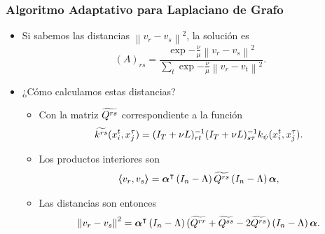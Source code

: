\documentclass[aspectratio=43]{beamer}
\newcommand{\norm}[1]{\left\lVert#1\right\rVert}
\newcommand{\upper}[1]{\expandafter\MakeUppercase\expandafter{#1}}
\newcommand{\mymat}[1]{\upper{#1}}
\newcommand{\myvec}[1]{\bm{#1}}
\newcommand{\fv}[1]{\myvec{#1}}
\newcommand{\fm}[1]{\mymat{#1}}
\newcommand{\dotp}[2]{\bm{\left\langle} #1, #2 \bm{\right\rangle}}
\newcommand{\nsamples}{n}
\newcommand{\ntasks}{T}
\begin{document}
\begin{frame}
      \frametitle{Algoritmo Adaptativo para Laplaciano de Grafo}

      \begin{itemize}
            \item Si sabemos las distancias $\norm{v_r - v_s}^2$, la solución es
            \begin{equation}\nonumber%
                  (A)_{rs} = \frac{\exp{-\frac{\nu}{\mu} \norm{{v}_r - {v}_s}^2 } }{\sum_t \exp{-\frac{\nu}{\mu}  \norm{{v}_r - {v}_t}^2} } .
              \end{equation}
            \item ¿Cómo calculamos estas distancias?
            \begin{itemize}
                  \item Con la matriz $ \widetilde{{\fm{Q}^{rs}}}$ correspondiente a la función
            \begin{equation}
                  \nonumber%
                  \widetilde{{k^{rs}}}(x_i^t, x_j^\tau) = (\fm{I}_\ntasks + \nu \fm{L})^{-1}_{rt} (\fm{I}_\ntasks + \nu \fm{L})^{-1}_{s\tau} k_\psi(x_i^t, x_j^\tau) .
              \end{equation}
            \item Los productos interiores son
            \begin{equation}\nonumber%
                  \dotp{v_r}{v_s} = \fv{\alpha}^\intercal \left(\fm{I}_{\nsamples} - \Lambda \right) \widetilde{{\fm{Q}^{rs}}} \left(\fm{I}_{\nsamples} - \Lambda \right) \fv{\alpha} ,
              \end{equation}
              \item Las distancias son entonces
              \begin{equation}\nonumber%
                  \norm{v_r - v_s}^2 = \fv{\alpha}^\intercal \left(\fm{I}_{\nsamples} - \Lambda \right) (\widetilde{{\fm{Q}^{rr}}} + \widetilde{{\fm{Q}^{ss}}} - 2\widetilde{{\fm{Q}^{rs}}}) \left(\fm{I}_{\nsamples} - \Lambda \right) \fv{\alpha}.
              \end{equation}
            \end{itemize}     
      \end{itemize}

\end{frame}
\end{document}
